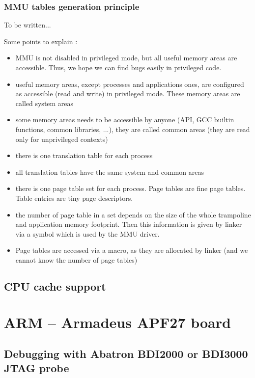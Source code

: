 \subsubsection{MMU tables generation principle}

To be written...

Some points to explain :
\begin{itemize}
\item MMU is not disabled in privileged mode, but all useful memory areas are accessible. Thus, we hope we can find bugs easily in privileged code.
\item useful memory areas, except processes and applications ones, are configured as accessible (read and write) in privileged mode. These memory areas are called system areas
\item some memory areas needs to be accessible by anyone (API, GCC builtin functions, common libraries, ...), they are called common areas (they are read only for unprivileged contexts)
\item there is one translation table for each process
\item all translation tables have the same system and common areas
\item there is one page table set for each process. Page tables are fine page tables. Table entries are tiny page descriptors.
\item the number of page table in a set depends on the size of the whole trampoline and application memory footprint. Then this information is given by linker via a symbol which is used by the MMU driver.
\item Page tables are accessed via a macro, as they are allocated by linker (and we cannot know the number of page tables)
\end{itemize}

\subsection{CPU cache support}

\section{ARM -- Armadeus APF27 board}

\subsection{Debugging with Abatron BDI2000 or BDI3000 JTAG probe}

